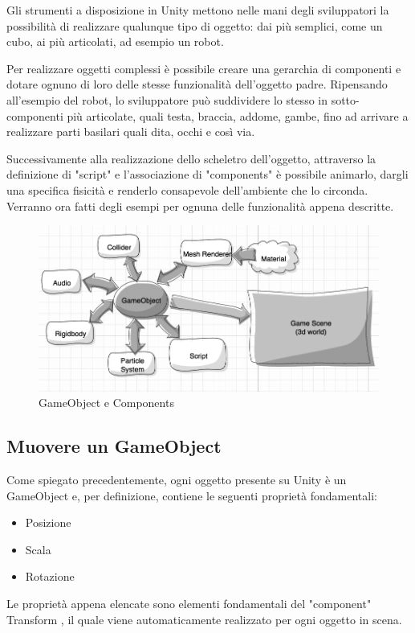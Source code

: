 Gli strumenti a disposizione in Unity mettono nelle mani degli sviluppatori la possibilità di realizzare qualunque tipo di oggetto: dai più semplici, come un cubo, ai più articolati, ad esempio un robot. 

\medskip

Per realizzare oggetti complessi è possibile creare una gerarchia di componenti e dotare ognuno di loro delle stesse funzionalità dell'oggetto padre. Ripensando all'esempio del robot, lo sviluppatore può suddividere lo stesso in sotto-componenti più articolate, quali testa, braccia, addome, gambe, fino ad arrivare a realizzare parti basilari quali dita, occhi e così via.

\medskip

Successivamente alla realizzazione dello scheletro dell'oggetto, attraverso la definizione di "script" e l'associazione di "components" è possibile animarlo, dargli una specifica fisicità e renderlo consapevole dell'ambiente che lo circonda. Verranno ora fatti degli esempi per ognuna delle funzionalità appena descritte.

\begin{figure}[H]
\centering
\includegraphics[width=\textwidth]{figures/unity_diagram.png}
\caption{GameObject e Components}
\end{figure}

\subsection{Muovere un GameObject}

Come spiegato precedentemente, ogni oggetto presente su Unity è un GameObject e, per definizione, contiene le seguenti proprietà fondamentali: 
\begin{itemize}
    \item Posizione
    \item Scala
    \item Rotazione
\end{itemize}
Le proprietà appena elencate sono elementi fondamentali del "component" Transform \cite{unity_transform}, il quale viene automaticamente realizzato per ogni oggetto in scena.

